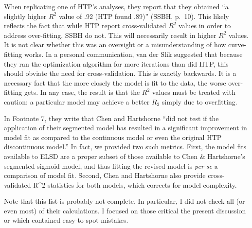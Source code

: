 \documentclass[
  english,
  doc,floatsintext]{apa6}
\begin{document}
\begin{appendix}
When replicating one of HTP's analyses, they report that they obtained
``a slightly higher \(R^2\) value of .92 (HTP found .89)'' (SSBH,
p.~10). This likely reflects the fact that while HTP report
cross-validated \(R^2\) values in order to address over-fitting, SSBH do
not. This will necessarily result in higher \(R^2\) values. It is not
clear whether this was an oversight or a misunderstanding of how
curve-fitting works. In a personal communication, van der Slik suggested
that because they ran the optimization algorithm for more iterations
than did HTP, this should obviate the need for cross-validation. This is
exactly backwards. It is a necessary fact that the more closely the
model is fit to the data, the worse over-fitting gets. In any case, the
result is that the \(R^2\) values must be treated with caution: a
particular model may achieve a better \(R_2\) simply due to overfitting.

In Footnote 7, they write that Chen and Hartshorne ``did not test if the
application of their segmented model has resulted in a significant
improvement in model fit as compared to the continuous model or even the
original HTP discontinuous model.'' In fact, we provided two such
metrics. First, the model fits available to ELSD are a proper subset of
those available to Chen \& Hartshorne's segmented sigmoid model, and
thus fitting the revised model is \emph{per se} a comparison of model
fit. Second, Chen and Hartshorne also provide cross-validated R\^{}2
statistics for both models, which corrects for model complexity.

Note that this list is probably not complete. In particular, I did not
check all (or even most) of their calculations. I focused on those
critical the present discussion or which contained easy-to-spot
mistakes.
\end{appendix}
\end{document}
